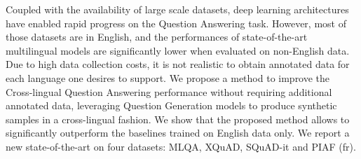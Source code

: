 Coupled with the availability of large scale datasets, deep learning architectures have enabled rapid progress on the Question Answering task. However, most of those datasets are in English, and the performances of state-of-the-art multilingual models are significantly lower when evaluated on non-English data. Due to high data collection costs, it is not realistic to obtain annotated data for each language one desires to support. We propose a method to improve the Cross-lingual Question Answering performance without requiring additional annotated data, leveraging Question Generation models to produce synthetic samples in a cross-lingual fashion. We show that the proposed method allows to significantly outperform the baselines trained on English data only. We report a new state-of-the-art on four datasets: MLQA, XQuAD, SQuAD-it and PIAF (fr).

